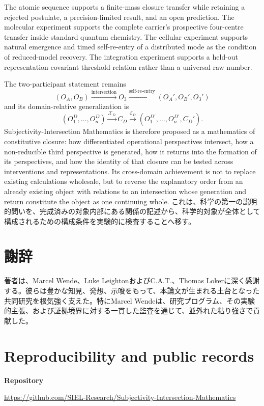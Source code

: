 \documentclass[11pt,a4paper]{article}
\newcommand{\OA}{\ensuremath{O_{A}}}
\newcommand{\OB}{\ensuremath{O_{B}}}
\newcommand{\Othree}{\ensuremath{O_{3}}}
\begin{document}
The atomic sequence supports a finite-mass closure transfer while retaining a rejected postulate, a precision-limited result, and an open prediction. The molecular experiment supports the complete carrier's prospective four-centre transfer inside standard quantum chemistry. The cellular experiment supports natural emergence and timed self-re-entry of a distributed mode as the condition of reduced-model recovery. The integration experiment supports a held-out representation-covariant threshold relation rather than a universal raw number.

The two-participant statement remains
\[
 \boxed{(\OA,\OB)\xrightarrow{\text{intersection}}\Othree
 \xrightarrow{\text{self-re-entry}}(\OA',\OB',\Othree')}
\]
and its domain-relative generalization is
\[
 \boxed{(O_1^D,\ldots,O_n^D)\xrightarrow{\mathcal X_D}C_D
 \xrightarrow{\mathcal E_D}(O_1^{D\prime},\ldots,O_n^{D\prime},C_D')}.
\]
Subjectivity-Intersection Mathematics is therefore proposed as a mathematics of constitutive closure: how differentiated operational perspectives intersect, how a non-reducible third perspective is generated, how it returns into the formation of its perspectives, and how the identity of that closure can be tested across interventions and representations. Its cross-domain achievement is not to replace existing calculations wholesale, but to reverse the explanatory order from an already existing object with relations to an intersection whose generation and return constitute the object as one continuing whole. これは、科学の第一の説明的問いを、完成済みの対象内部にある関係の記述から、科学的対象が全体として構成されるための構成条件を実験的に検査することへ移す。

\section*{謝辞}

著者は、Marcel Wende、Luke LeightonおよびC.A.T.、Thomas Lokerに深く感謝する。彼らは豊かな知見、発想、示唆をもって、本論文が生まれる土台となった共同研究を根気強く支えた。特にMarcel Wendeは、研究プログラム、その実験的主張、および証拠境界に対する一貫した監査を通じて、並外れた粘り強さで貢献した。

\appendix
\section{Reproducibility and public records}

\noindent\textbf{Repository}
\begin{center}
\small\url{https://github.com/SIEL-Research/Subjectivity-Intersection-Mathematics}
\end{center}
\end{document}
